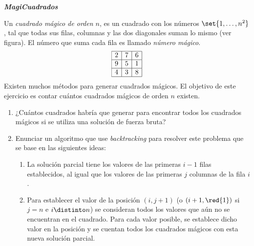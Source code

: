 {\small
  \begin{enunciado}{\ejercicio[MagiCuadrados]}
    \textbf{\textit{MagiCuadrados}}

    Un \textit{cuadrado mágico de orden $n$}, es un cuadrado con los números $\set{1,\ldots, n^2}$, tal que todas sus
    filas, columnas y las dos diagonales suman lo mismo (ver figura). El número que suma cada fila
    es llamado \textit{número mágico}.
    $$
      \begin{array}{|c|c|c|}
        \hline
        2 & 7 & 6 \\\hline
        9 & 5 & 1 \\\hline
        4 & 3 & 8 \\\hline
      \end{array}
    $$
    Existen muchos métodos para generar cuadrados mágicos. El objetivo de este ejercicio es contar
    cuántos cuadrados mágicos de orden $n$ existen.

    \begin{enumerate}[label=$\alph*$)]
      \item ¿Cuántos cuadrados habría que generar para encontrar todos los cuadrados mágicos si se
            utiliza una solución de fuerza bruta?

      \item
            Enunciar un algoritmo que use \textit{backtracking} para resolver este problema que se base
            en las siguientes ideas:
            \begin{enumerate}[label=\tiny$\blacksquare$]

              \item La solución parcial tiene los valores de las primeras $i-1$ filas establecidos, al igual que
                    los valores de las primeras $j$ columnas de la fila $i$.

              \item Para establecer el valor de la posición $(i, j+1)$ (o $(i+1, \red{1})$ si $j=n$ e $i \distinto n$) se consideran
                    todos los valores que aún no se encuentran en el cuadrado. Para cada valor posible, se
                    establece dicho valor en la posición y se cuentan todos los cuadrados mágicos con esta
                    nueva solución parcial.


\end{enumerate}
\end{enumerate}
\end{enunciado}}
